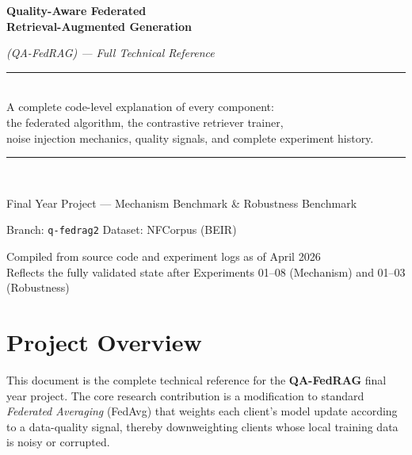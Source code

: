 \documentclass[12pt,a4paper]{article}
\begin{document}
\begin{titlepage}
  \centering
  \vspace*{2cm}
  {\Huge\bfseries Quality-Aware Federated\\Retrieval-Augmented Generation\par}
  \vspace{0.8cm}
  {\Large\textit{(QA-FedRAG) --- Full Technical Reference}\par}
  \vspace{1.5cm}
  \rule{\linewidth}{0.5pt}\\[0.4cm]
  {\large A complete code-level explanation of every component:\\
  the federated algorithm, the contrastive retriever trainer,\\
  noise injection mechanics, quality signals, and complete experiment history.}
  \rule{\linewidth}{0.5pt}\\[1.5cm]
  {\large Final Year Project --- Mechanism Benchmark \& Robustness Benchmark\par}
  \vspace{0.5cm}
  {\normalsize Branch: \texttt{q-fedrag2} \quad Dataset: NFCorpus (BEIR)\par}
  \vspace{1cm}
  {\normalsize\color{gray} Compiled from source code and experiment logs as of April 2026\\
  Reflects the fully validated state after Experiments 01--08 (Mechanism) and 01--03 (Robustness)\par}
  \vfill
\end{titlepage}

\tableofcontents
\newpage

\section{Project Overview}

This document is the complete technical reference for the \textbf{QA-FedRAG} final year project. The core research contribution is a modification to standard \textit{Federated Averaging} (FedAvg) that weights each client's model update according to a data-quality signal, thereby downweighting clients whose local training data is noisy or corrupted.
\end{document}
